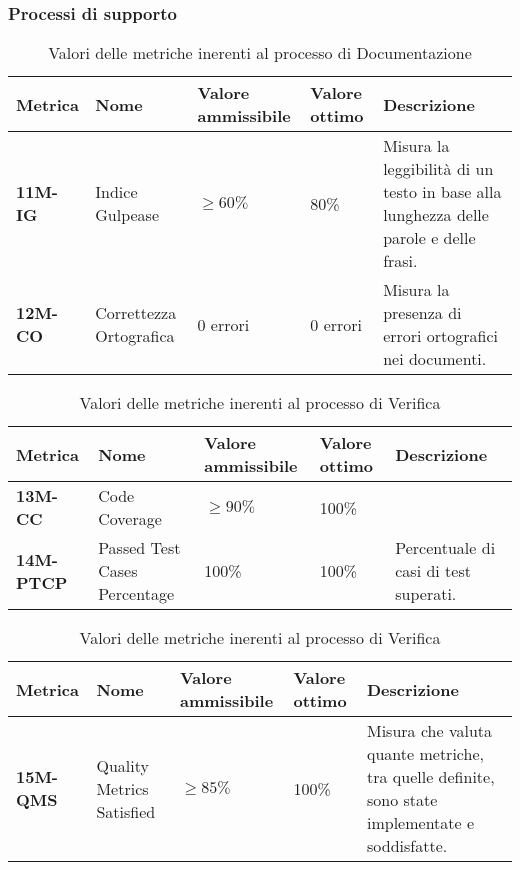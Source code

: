 \subsubsection{Processi di supporto}
\begin{table}[h!]
	\centering
	\begin{tabularx}{\textwidth}{|X|X|X|X|X|} 	 
		\hline
		\textbf{Metrica} 	& \textbf{Nome} & \textbf{Valore ammissibile} & \textbf{Valore ottimo}& \textbf{Descrizione}\\  	 
		\hline
		\textbf{11M-IG} & Indice Gulpease & $\geq 60\% $ & 80\% & Misura la leggibilità di un testo in base alla lunghezza delle parole e delle frasi.\\
		\hline
		\textbf{12M-CO} & Correttezza Ortografica & 0 errori & 0 errori &Misura la presenza di errori ortografici nei documenti.\\ 
		\hline
	\end{tabularx}
	\caption{ Valori delle metriche inerenti al processo di Documentazione}
	\label{table:3}
\end{table}
\begin{table}[h!]
	\centering
	\begin{tabularx}{\textwidth}{|X|X|X|X|X|} 	 
		\hline
		\textbf{Metrica} 	& \textbf{Nome} & \textbf{Valore ammissibile} & \textbf{Valore ottimo}& \textbf{Descrizione}\\  	 
		\hline
		\textbf{13M-CC} & Code Coverage & $\geq 90\% $ & 100\% &\\
		\hline
		\textbf{14M-PTCP} & Passed Test Cases Percentage & 100\% & 100\% & Percentuale di casi di test superati.\\ 
		\hline
	\end{tabularx}
	\caption{ Valori delle metriche inerenti al processo di Verifica}
	\label{table:4}
\end{table}
\begin{table}[h!]
	\centering
	\begin{tabularx}{\textwidth}{|X|X|X|X|X|} 	 
		\hline
		\textbf{Metrica} 	& \textbf{Nome} & \textbf{Valore ammissibile} & \textbf{Valore ottimo} & \textbf{Descrizione}\\  	 
		\hline
		\textbf{15M-QMS} & Quality Metrics Satisfied & $\geq 85\% $ & 100\% & Misura che valuta quante metriche, tra quelle definite, sono state implementate e soddisfatte.\\
		\hline
	\end{tabularx}
	\caption{ Valori delle metriche inerenti al processo di Verifica}
	\label{table:5}
\end{table}
